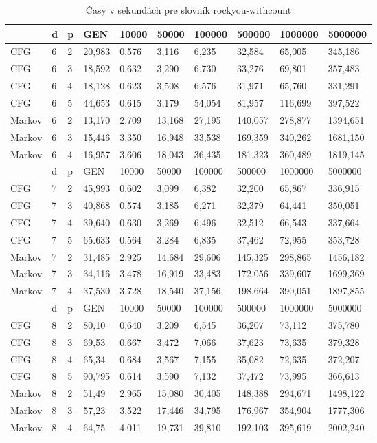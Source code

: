 \begin{table}[]
\centering
\caption{Časy v sekundách pre slovník rockyou-withcount}
\label{tbl:rockyouTime}
\begin{tabular}{lll|lllllll}
       & d & p & GEN     & 10000  & 50000  & 100000 & 500000 & 1000000 & 5000000 \\ \hline
CFG    & 6 & 2 & 20,983   & 0,576  & 3,116  & 6,235  & 32,584 & 65,005  & 345,186 \\
CFG    & 6 & 3 & 18,592    & 0,632  & 3,290  & 6,730  & 33,276 & 69,801  & 357,483 \\
CFG    & 6 & 4 & 18,128   & 0,623  & 3,508   & 6,576   & 31,971 & 65,760  & 331,291 \\
CFG    & 6 & 5 & 44,653 & 0,615 & 3,179 & 54,054 & 81,957 & 116,699 & 397,522 \\
Markov & 6 & 2 & 13,170     & 2,709  & 13,168  & 27,195  & 140,057 & 278,877  & 1394,651 \\
Markov & 6 & 3 & 15,446     & 3,350  & 16,948  & 33,538  & 169,359 & 340,262  & 1681,150 \\
Markov & 6 & 4 & 16,957     & 3,606  & 18,043  & 36,435 & 181,323 & 360,489  & 1819,145 \\ \hline
       & d & p & GEN     & 10000  & 50000  & 100000 & 500000 & 1000000 & 5000000 \\ \hline
CFG    & 7 & 2 & 45,993    & 0,602  & 3,099  & 6,382  & 32,200  & 65,867  & 336,915 \\
CFG    & 7 & 3 & 40,868   & 0,574   & 3,185  & 6,271  & 32,379 & 64,441  & 350,051 \\
CFG    & 7 & 4 & 39,640   & 0,630  & 3,269  & 6,496  & 32,512 & 66,543  & 337,664 \\
CFG    & 7 & 5 & 65.633 & 0,564 & 3,284 & 6,835 & 37,462  & 72,955 & 353,728 \\
Markov & 7 & 2 & 31,485  & 2,925  & 14,684  & 29,606  & 145,325  & 298,865  & 1456,182 \\
Markov & 7 & 3 & 34,116     & 3,478  & 16,919  & 33,483  & 172,056 & 339,607  & 1699,369  \\
Markov & 7 & 4 & 37,530     & 3,728   & 18,540 & 37,156 & 198,664 & 390,051 & 1897,855 \\ \hline
       & d & p & GEN     & 10000  & 50000  & 100000 & 500000 & 1000000 & 5000000 \\ \hline
CFG    & 8 & 2 & 80,10   & 0,640  & 3,209  & 6,545  & 36,207 & 73,112  & 375,780 \\
CFG    & 8 & 3 & 69,53   & 0,667  & 3,472   & 7,066  & 37,623 & 73,635  & 379,328 \\
CFG    & 8 & 4 & 65,34   & 0,684  & 3,567  & 7,155  & 35,082 & 72,635  & 372,207 \\
CFG    & 8 & 5 & 90,795 & 0,614 & 3,590 & 7,132 & 37,472 & 73,995 & 366,613 \\
Markov & 8 & 2 & 51,49     & 2,965  & 15,080  & 30,405  & 148,388  & 294,671  & 1498,122 \\
Markov & 8 & 3 & 57,23     & 3,522  & 17,446  & 34,795 & 176,967 & 354,904  & 1777,306 \\
Markov & 8 & 4 & 64,75     & 4,011 & 19,731 & 39,810 & 192,103 & 395,619  & 2002,240
\end{tabular}
\end{table}

